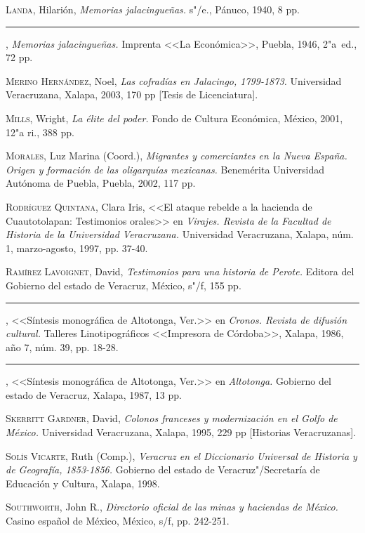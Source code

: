 \documentclass[14pt,twoside,final]{extbook} %
\begin{document}
\textsc{Landa}, Hilarión, \emph{Memorias jalacingueñas.} s"/e., Pánuco, 1940, 8 pp.

\rule{1cm}{0.4pt}, \emph{Memorias jalacingueñas.} Imprenta <<La Económica>>, Puebla, 1946, 2"a~ed., 72 pp.

\textsc{Merino Hernández}, Noel, \emph{Las cofradías en Jalacingo, 1799-1873.} Universidad Veracruzana, Xalapa, 2003, 170 pp [Tesis de Licenciatura].

\textsc{Mills}, Wright, \emph{La élite del poder.} Fondo de Cultura Económica, México, 2001, 12"a ri., 388 pp.

\textsc{Morales}, Luz Marina (Coord.), \emph{Migrantes y comerciantes en la Nueva España. Origen y formación de las oligarquías mexicanas.} Benemérita Universidad Autónoma de Puebla, Puebla, 2002, 117 pp. \enlargethispage{\baselineskip}

\textsc{Rodríguez Quintana}, Clara Iris, <<El ataque rebelde a la hacienda de Cuautotolapan: Testimonios orales>> en \emph{Virajes. Revista de la Facultad de Historia de la Universidad Veracruzana.} Universidad Veracruzana, Xalapa, núm. 1, marzo-agosto, 1997, pp. 37-40.

\textsc{Ramírez Lavoignet}, David, \emph{Testimonios para una historia de Perote.} Editora del Gobierno del estado de Veracruz, México, s"/f, 155 pp.

\rule{1cm}{0.4pt}, <<Síntesis monográfica de Altotonga, Ver.>> en \emph{Cronos. Revista de difusión cultural.} Talleres Linotipográficos <<Impresora de Córdoba>>, Xalapa, 1986,
año 7, núm. 39, pp. 18-28.

\rule{1cm}{0.4pt}, <<Síntesis monográfica de Altotonga, Ver.>> en \emph{Altotonga.} Gobierno del estado de Veracruz, Xalapa, 1987, 13 pp.

\textsc{Skerritt Gardner}, David, \emph{Colonos franceses y modernización en el Golfo de México.} Universidad Veracruzana, Xalapa, 1995, 229 pp [Historias Veracruzanas].

\textsc{Solís Vicarte}, Ruth (Comp.), \emph{Veracruz en el Diccionario Universal de Historia y de Geografía, 1853-1856.} Gobierno del estado de Veracruz"/Secreta\-ría de Educación y Cultura, Xalapa, 1998.

\textsc{Southworth}, John R., \emph{Directorio oficial de las minas y haciendas de México.} Casino español de México, México, s/f, pp. 242-251.
\end{document}

